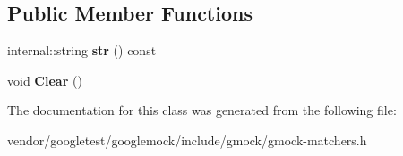 \subsection*{Public Member Functions}
\begin{DoxyCompactItemize}
\item 
\mbox{\label{classtesting_1_1_string_match_result_listener_ad1ed3c6b1077cc76b67567b33f5a2bd1}} 
internal\+::string {\bfseries str} () const
\item 
\mbox{\label{classtesting_1_1_string_match_result_listener_afd6e59e768516386a3908e7f5cc135d3}} 
void {\bfseries Clear} ()
\end{DoxyCompactItemize}


The documentation for this class was generated from the following file\+:\begin{DoxyCompactItemize}
\item 
vendor/googletest/googlemock/include/gmock/gmock-\/matchers.\+h\end{DoxyCompactItemize}
